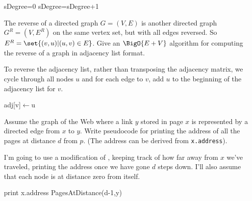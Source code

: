 \documentclass[12pt,letterpaper]{hmcpset}
\begin{document}
\begin{solution}
\begin{algorithmic}
\State sDegree=0
\State sDegree=sDegree+1
\EndFor
\EndFor
\EndFunction
\end{algorithmic}
\end{solution}

\begin{problem}[3]
The reverse of a directed graph $G=(V,E)$ is another directed graph $G^R=(V,E^R)$ on the same vertex set, but with all edges reversed.  So $E^R = \set{(v,u)|(u,v) \in E}$.  Give an $\BigO{E+V}$ algorithm for computing the reverse of a graph in adjacency list format.
\end{problem}

\begin{solution}
To reverse the adjacency list, rather than transposing the adjacency matrix, we cycle through all nodes $u$ and for each edge to $v$, add $u$ to the beginning of the adjacency list for $v$.
\begin{algorithmic}
\State adj[v]$\gets$u
\EndFor
\EndFor
\end{algorithmic}
\end{solution}

\begin{problem}[4]
Assume the graph of the Web where a link $y$ stored in page $x$ is represented by a directed edge from $x$ to $y$.  Write pseudocode for printing the address of all the pages at distance $d$ from $p$. (The address can be derived from \verb|x.address|).
\end{problem}

\begin{solution}
I'm going to use a modification of , keeping track of how far away from $x$ we've traveled, printing the address once we have gone $d$ steps down.  I'll also assume that each node is at distance zero from itself.
\begin{algorithmic}
\State print x.address
\Else
{}
\State PagesAtDistance(d-1,y)
\EndFor
\EndIf
\EndFunction
\end{algorithmic}
\end{solution}

\end{document}
